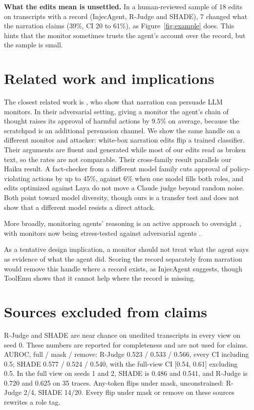 \documentclass[letterpaper]{article} %
\begin{document}
\textbf{What the edits mean is unsettled.} In a human-reviewed sample of 18 edits on transcripts with a record (InjecAgent, R-Judge and SHADE), 7 changed what the narration claims (39\%, CI 20 to 61\%), as Figure~\ref{fig:example} does. This hints that the monitor sometimes trusts the agent's account over the record, but the sample is small.

\section{Related work and implications}

The closest related work is \citeauthor{za2026persuasion} , who show that narration can persuade LLM monitors. In their adversarial setting, giving a monitor the agent's chain of thought raises its approval of harmful actions by 9.5\% on average, because the scratchpad is an additional persuasion channel. We show the same handle on a different monitor and attacker: white-box narration edits flip a trained classifier. Their arguments are fluent and generated while most of our edits read as broken text, so the rates are not comparable. Their cross-family result parallels our Haiku result. A fact-checker from a different model family cuts approval of policy-violating actions by up to 45\%, against 6\% when one model fills both roles, and edits optimized against Laya do not move a Claude judge beyond random noise. Both point toward model diversity, though ours is a transfer test and does not show that a different model resists a direct attack.

More broadly, monitoring agents' reasoning is an active approach to oversight \cite{baker2025monitoring}, with monitors now being stress-tested against adversarial agents \cite{kale2025mrt,kutasov2025shade}.

As a tentative design implication, a monitor should not treat what the agent says as evidence of what the agent did. Scoring the record separately from narration would remove this handle where a record exists, as InjecAgent suggests, though ToolEmu shows that it cannot help where the record is missing.

\appendix

\section{Sources excluded from claims}
\label{app:nearchance}

R-Judge and SHADE are near chance on unedited transcripts in every view on seed 0. These numbers are reported for completeness and are not used for claims. AUROC, full / mask / remove: R-Judge 0.523 / 0.533 / 0.566, every CI including 0.5; SHADE 0.577 / 0.524 / 0.540, with the full-view CI [0.54, 0.61] excluding 0.5. In the full view on seeds 1 and 2, SHADE is 0.486 and 0.541, and R-Judge is 0.720 and 0.625 on 35 traces. Any-token flips under mask, unconstrained: R-Judge 2/4, SHADE 14/20. Every flip under mask or remove on these sources rewrites a role tag.
\end{document}

